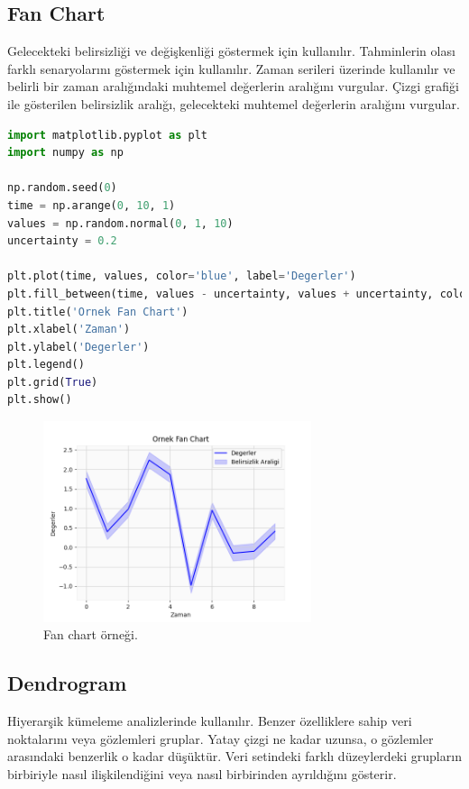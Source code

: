 \newpage

\subsection{Fan Chart}
Gelecekteki belirsizliği ve değişkenliği göstermek için kullanılır. Tahminlerin olası farklı senaryolarını göstermek için kullanılır. Zaman serileri üzerinde kullanılır ve belirli bir zaman aralığındaki muhtemel değerlerin aralığını vurgular. Çizgi grafiği ile gösterilen belirsizlik aralığı, gelecekteki muhtemel değerlerin aralığını vurgular.

\begin{lstlisting}[language=Python]
import matplotlib.pyplot as plt
import numpy as np

np.random.seed(0)
time = np.arange(0, 10, 1)
values = np.random.normal(0, 1, 10)
uncertainty = 0.2

plt.plot(time, values, color='blue', label='Degerler')
plt.fill_between(time, values - uncertainty, values + uncertainty, color='blue', alpha=0.2, label='Belirsizlik Araligi')
plt.title('Ornek Fan Chart')
plt.xlabel('Zaman')
plt.ylabel('Degerler')
plt.legend()
plt.grid(True)
plt.show()
\end{lstlisting}

\begin{figure}[h]
    \centering
    \includegraphics[width=0.7\textwidth]{images/fan_chart.png}
    \caption{Fan chart örneği.}
    \label{fig:enter-label}
\end{figure}

\newpage

\subsection{Dendrogram}
Hiyerarşik kümeleme analizlerinde kullanılır. Benzer özelliklere sahip veri noktalarını veya gözlemleri gruplar. Yatay çizgi ne kadar uzunsa, o gözlemler arasındaki benzerlik o kadar düşüktür. Veri setindeki farklı düzeylerdeki grupların birbiriyle nasıl ilişkilendiğini veya nasıl birbirinden ayrıldığını gösterir.


